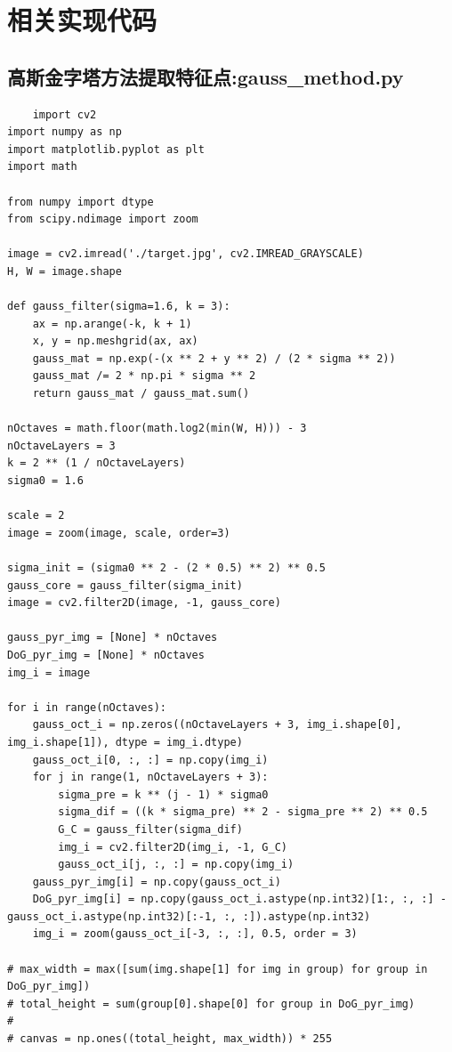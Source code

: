 \documentclass{article}
\begin{document}
\section{相关实现代码}

\subsection{高斯金字塔方法提取特征点:gauss\_method.py}


\begin{lstlisting}
    import cv2
import numpy as np
import matplotlib.pyplot as plt
import math

from numpy import dtype
from scipy.ndimage import zoom

image = cv2.imread('./target.jpg', cv2.IMREAD_GRAYSCALE)
H, W = image.shape

def gauss_filter(sigma=1.6, k = 3):
    ax = np.arange(-k, k + 1)
    x, y = np.meshgrid(ax, ax)
    gauss_mat = np.exp(-(x ** 2 + y ** 2) / (2 * sigma ** 2))
    gauss_mat /= 2 * np.pi * sigma ** 2
    return gauss_mat / gauss_mat.sum()

nOctaves = math.floor(math.log2(min(W, H))) - 3
nOctaveLayers = 3
k = 2 ** (1 / nOctaveLayers)
sigma0 = 1.6

scale = 2
image = zoom(image, scale, order=3)

sigma_init = (sigma0 ** 2 - (2 * 0.5) ** 2) ** 0.5
gauss_core = gauss_filter(sigma_init)
image = cv2.filter2D(image, -1, gauss_core)

gauss_pyr_img = [None] * nOctaves
DoG_pyr_img = [None] * nOctaves
img_i = image

for i in range(nOctaves):
    gauss_oct_i = np.zeros((nOctaveLayers + 3, img_i.shape[0], img_i.shape[1]), dtype = img_i.dtype)
    gauss_oct_i[0, :, :] = np.copy(img_i)
    for j in range(1, nOctaveLayers + 3):
        sigma_pre = k ** (j - 1) * sigma0
        sigma_dif = ((k * sigma_pre) ** 2 - sigma_pre ** 2) ** 0.5
        G_C = gauss_filter(sigma_dif)
        img_i = cv2.filter2D(img_i, -1, G_C)
        gauss_oct_i[j, :, :] = np.copy(img_i)
    gauss_pyr_img[i] = np.copy(gauss_oct_i)
    DoG_pyr_img[i] = np.copy(gauss_oct_i.astype(np.int32)[1:, :, :] - gauss_oct_i.astype(np.int32)[:-1, :, :]).astype(np.int32)
    img_i = zoom(gauss_oct_i[-3, :, :], 0.5, order = 3)

# max_width = max([sum(img.shape[1] for img in group) for group in DoG_pyr_img])
# total_height = sum(group[0].shape[0] for group in DoG_pyr_img)
#
# canvas = np.ones((total_height, max_width)) * 255


\end{lstlisting}
\end{document}
